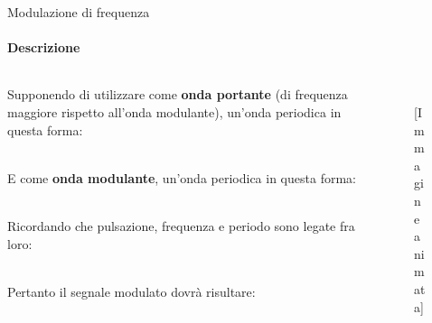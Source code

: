 \documentclass[aspectratio=169]{beamer}
\newcommand*{\vet}{\fontfamily{qzc}\selectfont}
\begin{document}
\begin{frame}{Modulazione di frequenza}
	\framesubtitle{Descrizione}
	
		\begin{columns}
		\begin{column}{0.6\textwidth}
			Supponendo di utilizzare come \textbf{onda portante} (di frequenza maggiore rispetto all'onda modulante), un'onda periodica in questa forma:\\
			\smallskip
			\\
			\smallskip
			\raggedright{E come \textbf{onda modulante}, un'onda periodica in questa forma:}\\
			\smallskip
			\\
			\smallskip
			\raggedright{Ricordando che pulsazione, frequenza e periodo sono legate fra loro:}\\
			\smallskip
			\centering{{\vet f} = $\frac{1}{T}$\quad$\omega = 2 \pi$ {\vet f} = $\frac{2\pi}{T}$}\\
			\smallskip
			\raggedright{Pertanto il segnale modulato dovrà risultare:}\\
			\smallskip
			\\
		\end{column}
		\begin{column}{0.4\textwidth}
			\begin{figure}
				\raggedright
				\\
				\qquad \qquad \tiny {\textcolor{gray!80}{[Immagine animata]}}
			\end{figure}
		\end{column}
	\end{columns}
	
\end{frame}
\end{document}
